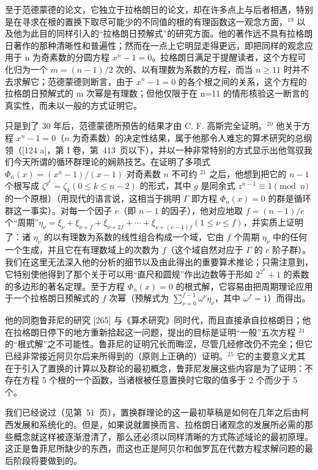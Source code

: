 至于范德蒙德的论文，它独立于拉格朗日的论文，却在许多点上与后者相遇，特别是在寻求在根的置换下取尽可能少的不同值的根的有理函数这一观念方面，\(^{19}\) 以及他为此目的同样引入的“拉格朗日预解式”的研究方面。他的著作远不具有拉格朗日著作的那种清晰性和普遍性；然而在一点上它明显走得更远，即把同样的观念应用于 n 为奇素数的分圆方程 \(x^{n}-1=0\)。拉格朗日满足于提醒读者，这个方程可化归为一个 \(m=(n-1)/2\) 次的、以有理数为系数的方程，而当 \(n\geq11\) 时并不去求解它；范德蒙德则断言，由于 \(x^{n}-1=0\) 的各个根之间的关系，这个方程的拉格朗日预解式的 m 次幂是有理数；但他仅限于在 n=11 的情形核验这一断言的真实性，而未以一般的方式证明它。

只是到了 30 年后，范德蒙德所预告的结果才由 C. F. 高斯完全证明。\(^{20}\) 他关于方程 \(x^n - 1 = 0\)（\(n\) 为奇素数）的决定性结果，属于他那令人难忘的算术研究的总纲领（{[}124 a{]}，第 I 卷，第~413~页以下），并以一种非常特别的方式显示出他驾驭我们今天所谓的循环群理论的娴熟技艺。在证明了多项式 \(\Phi_n(x) = (x^n - 1)/(x - 1)\) 对奇素数 \(n\) 不可约 \(^{21}\) 之后，他想到把它的 \(n - 1\) 个根写成 \(\zeta^{g^k} = \zeta_k (0 \leq k \leq n - 2)\) 的形式，其中 \(g\) 是同余式 \(z^{n-1} \equiv 1 \pmod{n}\) 的一个原根）（用现代的语言说，这相当于挑明 \(\Gamma\) 即方程 \(\Phi_n(x) = 0\) 的群是循环群这一事实）。对每一个因子 \(e\)（即 \(n-1\) 的因子），他对应地取 \(f = (n-1)/e\) 个“周期”\(\eta_\nu = \xi_\nu + \xi_{\nu+f} + \xi_{\nu+2f} + \cdots + \xi_{\nu+(e-1)f} (1 \leq \nu \leq f)\)，并实质上证明了：诸 \(\eta_{\nu}\) 的以有理数为系数的线性组合构成一个域，它由 \(f\) 个周期 \(\eta_{\nu}\) 中的任何一个生成，并且它在有理数域上的次数为 \(f\)（这个域自然对应于 \(\Gamma\) 的 \(e\) 阶子群）。我们在这里无法深入他的分析的细节以及由此得出的重要算术推论；只需注意到，它特别使他得到了那个关于可以用“直尺和圆规”作出边数等于形如 \(2^{2^k} + 1\) 的素数的多边形的著名定理。至于方程 \(\Phi_n(x) = 0\) 的根式解，它容易由把周期理论应用于一个拉格朗日预解式的 \(f\) 次幂（预解式为 \(\sum_{\nu=0}^{f-1} \omega^\nu \eta_\nu\)，其中 \(\omega^f = 1\)）而得出。

他的同胞鲁菲尼的研究 {[}265{]} 与《算术研究》同时代，而且直接承自拉格朗日；他在拉格朗日停下的地方重新拾起这一问题，提出的目标是证明“一般”五次方程 \(^{24}\) 的“根式解”之不可能性。鲁菲尼的证明冗长而晦涩，尽管几经修改仍不完全；但它已经非常接近阿贝尔后来所得到的（原则上正确的）证明。\(^{25}\) 它的主要意义尤其在于引入了置换的计算以及群论的最初概念，鲁菲尼发展这些内容是为了证明：不存在方程 5 个根的一个函数，当诸根被任意置换时它取的值多于 2 个而少于 5 个。

我们已经说过（见第~51~页），置换群理论的这一最初草稿是如何在几年之后由柯西发展和系统化的。但是，如果说就置换而言、拉格朗日诸观念的发展所必需的那些概念就这样被逐渐澄清了，那么还必须以同样清晰的方式陈述域论的最初原理。这正是鲁菲尼所缺少的东西，而这也正是阿贝尔和伽罗瓦在代数方程求解问题的最后阶段将要做到的。

